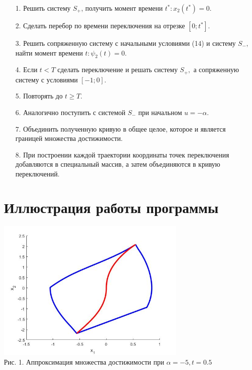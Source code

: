 \documentclass{article}
\theoremstyle{definition}
\begin{document}
 	\begin{itemize}
 		\item [1.]{Решить систему $S_+$, получить момент времени $t^*: x_2(t^*) = 0.$}
 		\item [2.]{Сделать перебор по времени переключения на отрезке $[0;t^*]$.}
 		\item [3.]{Решить сопряженную систему с начальными условиями (14) и систему $S_-,$ найти момент времени $t:\psi_2(t) = 0.$}
 		\item [4.]{Если $t < T$ сделать переключение и решать систему $S_+,$ а сопряженную систему с условиями $[-1;0].$}
 		\item [5.]{Повторять до $t \geq T.$}
 		\item [6.]{Аналогично поступить с системой $S_-$ при начальном $u = -\alpha.$}
 		\item [7.]{Объединить полученную кривую в общее целое, которое и является границей множества достижимости. }
 		\item [8.]{При построении каждой траектории координаты точек переключения добавляются в специальный массив, а затем объединяются в кривую переключений.}
 	\end{itemize}
 	
 	\newpage
 	{\section{Иллюстрация работы программы}}
 	\begin{center}
 		\includegraphics[width=0.7\textwidth]{example1.jpg}\\
 		{Рис. 1. Аппроксимация множества достижимости при $\alpha = -5, t = 0.5$ }
 	\end{center}
 
\end{document}
